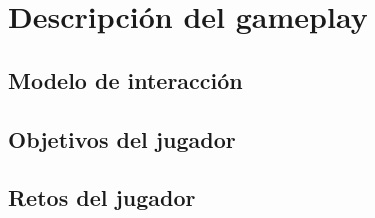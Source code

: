 \section{Descripción del gameplay} %




\subsection{Modelo de interacción}



\subsection{Objetivos del jugador}


\subsection{Retos del jugador}

